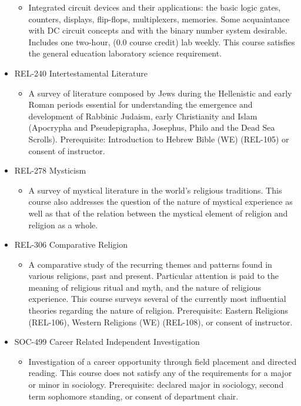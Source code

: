 \documentclass[
  letterpaper,
]{scrbook}
\providecommand{\tightlist}{%
  \setlength{\itemsep}{0pt}\setlength{\parskip}{0pt}}
\begin{document}
\begin{itemize}
  \begin{itemize}
  \tightlist
  \item
    Integrated circuit devices and their applications: the basic logic
    gates, counters, displays, flip-flops, multiplexers, memories. Some
    acquaintance with DC circuit concepts and with the binary number
    system desirable. Includes one two-hour, (0.0 course credit) lab
    weekly. This course satisfies the general education laboratory
    science requirement.
  \end{itemize}
\item
  REL-240 Intertestamental Literature

  \begin{itemize}
  \tightlist
  \item
    A survey of literature composed by Jews during the Hellenistic and
    early Roman periods essential for understanding the emergence and
    development of Rabbinic Judaism, early Christianity and Islam
    (Apocrypha and Pseudepigrapha, Josephus, Philo and the Dead Sea
    Scrolls). Prerequisite: Introduction to Hebrew Bible (WE) (REL-105)
    or consent of instructor.
  \end{itemize}
\item
  REL-278 Mysticism

  \begin{itemize}
  \tightlist
  \item
    A survey of mystical literature in the world's religious traditions.
    This course also addresses the question of the nature of mystical
    experience as well as that of the relation between the mystical
    element of religion and religion as a whole.
  \end{itemize}
\item
  REL-306 Comparative Religion

  \begin{itemize}
  \tightlist
  \item
    A comparative study of the recurring themes and patterns found in
    various religions, past and present. Particular attention is paid to
    the meaning of religious ritual and myth, and the nature of
    religious experience. This course surveys several of the currently
    most influential theories regarding the nature of religion.
    Prerequisite: Eastern Religions (REL-106), Western Religions (WE)
    (REL-108), or consent of instructor.
  \end{itemize}
\item
  SOC-499 Career Related Independent Investigation

  \begin{itemize}
  \tightlist
  \item
    Investigation of a career opportunity through field placement and
    directed reading. This course does not satisfy any of the
    requirements for a major or minor in sociology. Prerequisite:
    declared major in sociology, second term sophomore standing, or
    consent of department chair.
  \end{itemize}
\end{itemize}
\end{document}
